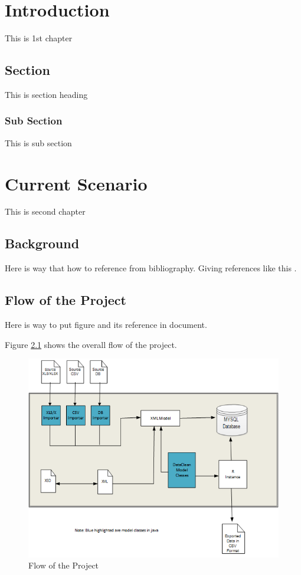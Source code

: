 \documentclass{report}
\begin{document}

\newpage
{}
\doublespacing
\large

\chapter{Introduction}
 This is 1st chapter
 
\section{Section}
This is section heading

\subsection{Sub Section}
This is sub section


\newpage	
\chapter{Current Scenario}
This is second chapter

\section{Background}
Here is way that how to reference from bibliography.
Giving references like this \cite{ch21}.


\section{Flow of the Project}

Here is way to put figure and its reference in document. 


Figure \ref{flow} shows the overall flow of the project.

\begin{figure}[h!]
\centering
\includegraphics[width=1.0\textwidth]{Figures/flow}
\caption{Flow of the Project}
\label{flow}
\end{figure}
\end{document}
